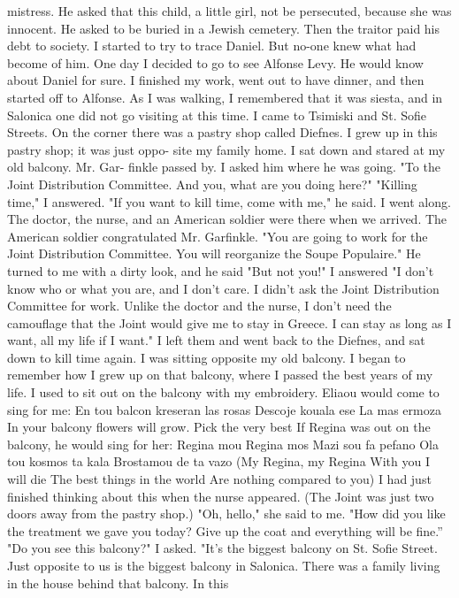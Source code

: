 mistress. He asked that this child, a little girl, not be persecuted, 
because she was innocent. He asked to be buried in a Jewish cemetery. 
Then the traitor paid his debt to society. 
I started to try to trace Daniel. But no-one knew what had become 
of him. One day I decided to go to see Alfonse Levy. He would know 
about Daniel for sure. I finished my work, went out to have dinner, 
and then started off to Alfonse. As I was walking, I remembered that 
it was siesta, and in Salonica one did not go visiting at this time. I 
came to Tsimiski and St. Sofie Streets. On the corner there was a pastry 
shop called Diefnes. I grew up in this pastry shop; it was just oppo-
site my family home. I sat down and stared at my old balcony. Mr. Gar-
finkle passed by. I asked him where he was going. 
"To the Joint Distribution Committee. And you, what are you doing 
here?" 
"Killing time," I answered. 
"If you want to kill time, come with me," he said. I went along. 
The doctor, the nurse, and an American soldier were there when we 
arrived. The American soldier congratulated Mr. Garfinkle. "You are 
going to work for the Joint Distribution Committee. You will reorganize 
the Soupe Populaire." He turned to me with a dirty look, and he said 
"But not you!" 
I answered "I don't know who or what you are, and I don't care. I 
didn't ask the Joint Distribution Committee for work. Unlike the doctor 
and the nurse, I don't need the camouflage that the Joint would give me 
to stay in Greece. I can stay as long as I want, all my life if I want." 
I left them and went back to the Diefnes, and sat down to kill time again. 
I was sitting opposite my old balcony. I began to remember how I 
grew up on that balcony, where I passed the best years of my life. I 
used to sit out on the balcony with my embroidery. Eliaou would come 
to sing for me: 
En tou balcon kreseran las rosas 
Descoje kouala ese 
La mas ermoza 
In your balcony flowers will grow. 
Pick the very best
If Regina was out on the balcony, he would sing for her: 
Regina mou Regina mos 
Mazi sou fa pefano 
Ola tou kosmos ta kala 
Brostamou de ta vazo 
(My Regina, my Regina 
With you I will die 
The best things in the world 
Are nothing compared to you) 
I had just finished thinking about this when the nurse appeared. 
(The Joint was just two doors away from the pastry shop.) 
"Oh, hello," she said to me. "How did you like the treatment we 
gave you today? Give up the coat and everything will be fine.”
"Do you see this balcony?" I asked. "It's the biggest balcony on 
St. Sofie Street. Just opposite to us is the biggest balcony in Salonica. There was a family living in the house behind that balcony. In this
